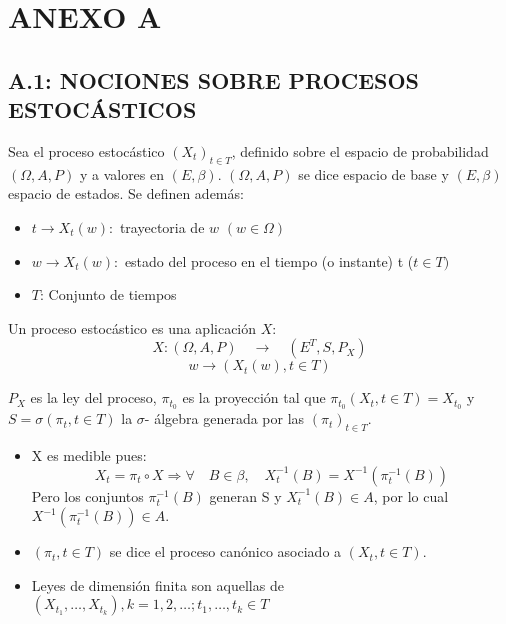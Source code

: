 \chapter*{ANEXO A}
\section*{A.1: NOCIONES SOBRE PROCESOS ESTOC\'{A}STICOS}

Sea el proceso estoc\'{a}stico $\left( {X_{t} } \right)_{t\in T}$, definido sobre el espacio de probabilidad $(\Omega ,A ,P)$ y a valores en $(E,\beta )$. $(\Omega ,A ,P)$ se dice espacio de base y $(E,\beta )$ espacio de estados. Se definen adem\'{a}s:

\begin{itemize}
\item $t\to X_{t} \left( w \right):$ trayectoria de $w$ $\left( {w\in \Omega } \right)$
\item $w\to X_{t} \left( w \right):$ estado del proceso en el tiempo (o instante) t ($t\in T)$
\item $T$: Conjunto de tiempos
\end{itemize}

Un proceso estoc\'{a}stico es una aplicaci\'{o}n $X$:
\[
X: (\Omega ,A ,P) \quad \to\quad (E^{T}, S ,P_{X} )
\]
\[
w\to \left( {X_{t} \left( w \right),t\in T} \right)
\]

$P_{X}$ es la ley del proceso, $\pi_{t_{0}}$ es la proyecci\'{o}n tal que $\pi_{t_{0} } \left( {X_{t} , t\in T} \right)=X_{t_{0} }$ y $S=\sigma \left( {\pi_{t}, t\in T} \right)$ la $\sigma$- \'{a}lgebra generada por las $\left( {\pi_{t} } \right)_{t\in T} $.

\begin{itemize}
      \item X es medible pues: 
\[
X_{t} =\pi_{t} \circ X\Rightarrow \forall \quad B\in \beta,\quad X_{t}^{-1} \left( B \right)=X^{-1}\left( {\pi_{t}^{-1} \left( B \right)} \right)
\]
Pero los conjuntos $\pi_{t}^{-1} (B)$ generan S y $X_{t}^{-1} (B)\in A$, por lo cual $X^{-1} (\pi_{t}^{-1} (B))\in A$.
      
      \item $\left( {\pi_{t}, t\in T} \right)$ se dice el proceso can\'{o}nico asociado a $\left( {X_{t}, t\in T} \right)$.
      \item Leyes de dimensi\'{o}n finita son aquellas de $\left( {X_{t_{1} } ,\ldots, X_{t_{k} } } \right), k=1,2, \ldots;t_{1},\ldots,t_{k} \in T$
\end{itemize}

